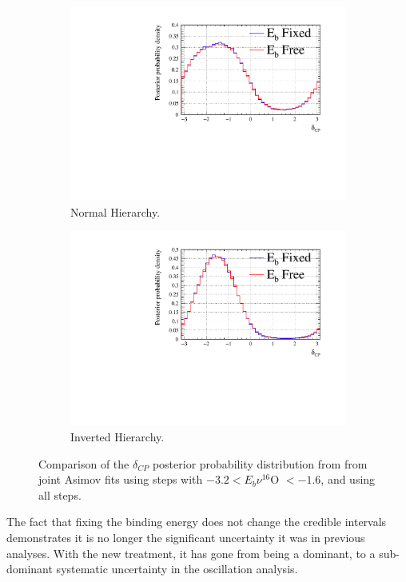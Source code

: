 \begin{figure}
\centering
\begin{subfigure}{.7\textwidth}
  \centering
  \includegraphics[width=0.95\linewidth]{figs/comparedmach3contours_Eb_m1.6_3.2/comparedmach3contours_RCeff_dcp_asimovA_NH}
  \caption{Normal Hierarchy.}
  \label{fig:EBdcpNH}
\end{subfigure}
\begin{subfigure}{.7\textwidth}
  \centering
  \includegraphics[width=0.95\linewidth]{figs/comparedmach3contours_Eb_m1.6_3.2/comparedmach3contours_RCeff_dcp_asimovA_IH}
  \caption{Inverted Hierarchy.}
  \label{fig:EBdcpIH}
\end{subfigure}
\caption{Comparison of the $\delta_{CP}$ posterior probability distribution from from joint Asimov fits using steps with $ -3.2 < E_b \nu ^{16}$O $< -1.6$, and using all steps.}
\label{fig:EBdcp}
\end{figure}

The fact that fixing the binding energy does not change the credible intervals demonstrates it is no longer the significant uncertainty it was in previous analyses. With the new treatment, it has gone from being a dominant, to a sub-dominant systematic uncertainty in the oscillation analysis.

\newpage

